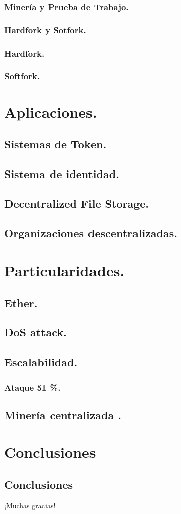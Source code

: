 \documentclass[usenames,dvipsnames]{beamer}
\begin{document}
\subsubsection{ Minería y Prueba de Trabajo. }
\subsubsection{ Hardfork y Sotfork. }
\subsubsection{ Hardfork. }
\subsubsection{ Softfork. }

\section { Aplicaciones. }
\subsection{ Sistemas de Token. }
\subsection{ Sistema de identidad. }
\subsection{ Decentralized File Storage. }
\subsection{ Organizaciones descentralizadas. }

\section{ Particularidades. }
\subsection{ Ether. }
\subsection{ DoS attack. }
\subsection{ Escalabilidad. }
\subsubsection{ Ataque 51 \%. }
\subsection{ Minería centralizada .}

\section{Conclusiones}
\subsection{Conclusiones}
\begin{frame}[standout]
  ¡Muchas gracias!
\end{frame}
\end{document}
